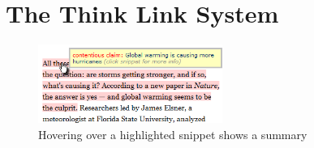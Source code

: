 \documentclass{chi2009}
\begin{document}
%

\section{The Think Link System}

\begin{figure}[tb]
	\begin{center}
	\includegraphics[width=6cm]{../screenshots/highlight_crop.png}
	\caption{Hovering over a highlighted snippet shows a summary}
	\label{highlight}
	\end{center}
\end{figure}
\end{document}
